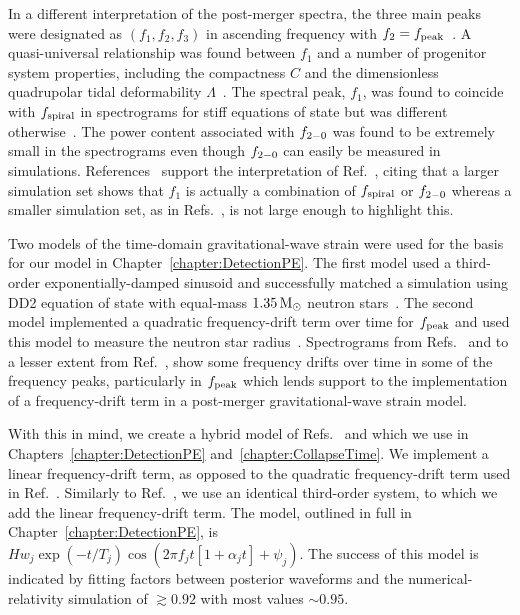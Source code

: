 \documentclass[../Thesis.tex]{subfiles}
\begin{document}
    
    In a different interpretation of the post-merger spectra, the three main peaks were designated as $(f_1, f_2, f_3)$ in ascending frequency with $f_2 = f_{\mathrm{peak}}$~\cite{Takami2014,Takami2015,Rezzolla2016}.
    A quasi-universal relationship was found between $f_1$ and a number of progenitor system properties, including the compactness $C$ and the dimensionless quadrupolar tidal deformability $\Lambda$~\cite{Takami2015}.
    The spectral peak, $f_1$, was found to coincide with $f_{\mathrm{spiral}}$ in spectrograms for stiff equations of state but was different otherwise~\cite{Rezzolla2016}.
    The power content associated with $f_{2-0}$ was found to be extremely small in the spectrograms  even though $f_{2-0}$ can easily be measured in simulations.
    References~\cite{Bauswein2019a,Vretinaris2019} support the interpretation of Ref.~\cite{Bauswein2015}, citing that a larger simulation set shows that $f_1$ is actually a combination of $f_{\mathrm{spiral}}$ or $f_{2-0}$ whereas a smaller simulation set, as in Refs.~\cite{Takami2014,Takami2015,Rezzolla2016}, is not large enough to highlight this.
\par
 
    
    
    Two models of the time-domain gravitational-wave strain were used for the basis for our model in Chapter~\ref{chapter:DetectionPE}.
    The first model used a third-order exponentially-damped sinusoid and successfully matched a simulation using DD2 equation of state with equal-mass $1.35\,\mathrm{M}_{\odot}$ neutron stars~\cite{Bauswein2016}.
    The second model implemented a quadratic frequency-drift term over time for $f_{\mathrm{peak}}$ and used this model  to measure the neutron star radius~\cite{Bose2018}.
    Spectrograms from Refs.~\cite{Rezzolla2016,Dietrich2017,Dietrich2017a} and to a lesser extent from Ref.~\cite{Maione2017}, show some frequency drifts over time in some of the frequency peaks, particularly in $f_{\mathrm{peak}}$ which lends support to the implementation of a frequency-drift term in a post-merger gravitational-wave strain model.
      \par
    
    With this in mind, we create a hybrid model of Refs.~\cite{Bauswein2016} and \cite{Bose2018} which we use in Chapters~\ref{chapter:DetectionPE} and~\ref{chapter:CollapseTime}. 
    We implement a linear frequency-drift term, as opposed to the quadratic frequency-drift term used in Ref.~\cite{Bose2018}.
    Similarly to Ref.~\cite{Bauswein2016}, we use an identical third-order system, to which we add the linear frequency-drift term.
    The model, outlined in full in Chapter~\ref{chapter:DetectionPE}, is $H w_j \exp(-t/T_j) \cos \left(2\pi f_j t\left[1+\alpha_j t\right]+\psi_j \right)$.
    The success of this model is indicated by fitting factors between posterior waveforms and the numerical-relativity simulation of $\gtrsim 0.92$ with most values $\sim 0.95$.
    \par
    
\end{document}
